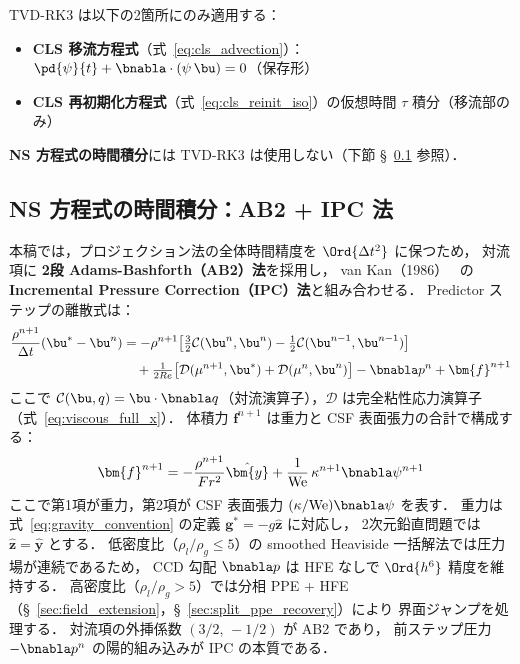 \begin{tcolorbox}[warnbox, title={TVD-RK3 の適用範囲}]
\label{warn:tvd_rk3_scope}
TVD-RK3 は以下の2箇所にのみ適用する：
\begin{itemize}
  \item \textbf{CLS 移流方程式}（式~\eqref{eq:cls_advection}）：$\pd{\psi}{t} + \bnabla\cdot(\psi\,\bu) = 0$（保存形）
  \item \textbf{CLS 再初期化方程式}（式~\eqref{eq:cls_reinit_iso}）の仮想時間 $\tau$ 積分（移流部のみ）
\end{itemize}
\textbf{NS 方程式の時間積分}には TVD-RK3 は使用しない（下節 §~\ref{sec:ab2_ipc} 参照）．
\end{tcolorbox}

\subsection{NS 方程式の時間積分：AB2 + IPC 法}
\label{sec:ab2_ipc}

本稿では，プロジェクション法の全体時間精度を $\Ord{\Delta t^2}$ に保つため，
対流項に \textbf{2段 Adams-Bashforth（AB2）法}を採用し，
van Kan（1986）~\cite{vanKan1986} の \textbf{Incremental Pressure Correction（IPC）法}と組み合わせる．
Predictor ステップの離散式は：
\begin{equation}
\begin{split}
  \frac{\rho^{n+1}}{\Delta t}(\bu^* - \bu^n)
  &= -\rho^{n+1}\!\left[\tfrac{3}{2}\mathcal{C}(\bu^n,\bu^n)
    - \tfrac{1}{2}\mathcal{C}(\bu^{n-1},\bu^{n-1})\right] \\
  &\quad + \tfrac{1}{2Re}\bigl[\mathcal{D}(\mu^{n+1},\bu^*)
    + \mathcal{D}(\mu^n,\bu^n)\bigr]
  - \bnabla p^n
  + \bm{f}^{n+1}
\end{split}
  \label{eq:predictor_ab2_ipc}
\end{equation}
ここで $\mathcal{C}(\bu,q) = \bu\cdot\bnabla q$（対流演算子），$\mathcal{D}$ は完全粘性応力演算子
（式~\eqref{eq:viscous_full_x}）．
体積力 $\bm{f}^{n+1}$ は重力と CSF 表面張力の合計で構成する：
\begin{equation*}
  \bm{f}^{n+1} = - \frac{\rho^{n+1}}{Fr^2}\hat{\bm{y}}
  + \frac{1}{\mathrm{We}}\,\kappa^{n+1}\bnabla\psi^{n+1}
\end{equation*}
ここで第1項が重力，第2項が CSF 表面張力 $(\kappa/\mathrm{We})\bnabla\psi$ を表す．
重力は式~\eqref{eq:gravity_convention} の定義 $\bm{g}^* = -g\hat{\bm{z}}$ に対応し，
2次元鉛直問題では $\hat{\bm{z}} = \hat{\bm{y}}$ とする．
低密度比（$\rho_l/\rho_g \leq 5$）の smoothed Heaviside 一括解法では圧力場が連続であるため，
CCD 勾配 $\bnabla p$ は HFE なしで $\Ord{h^6}$ 精度を維持する．
高密度比（$\rho_l/\rho_g > 5$）では分相 PPE + HFE（§~\ref{sec:field_extension}，§~\ref{sec:split_ppe_recovery}）により
界面ジャンプを処理する．
対流項の外挿係数 $(3/2,\,-1/2)$ が AB2 であり，
前ステップ圧力 $-\bnabla p^n$ の陽的組み込みが IPC の本質である．

